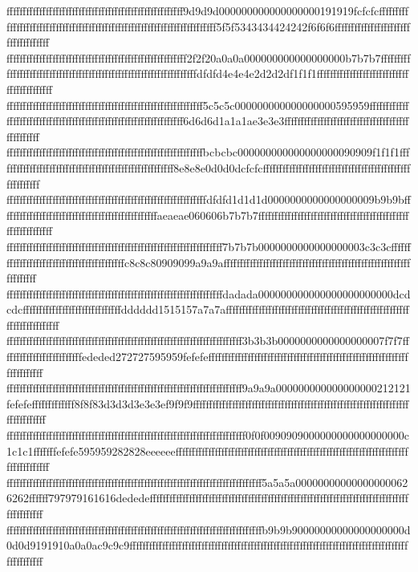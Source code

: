 {{{ffffffffffffffffffffffffffffffffffffffffffffffffffffff9d9d9d000000000000000000191919fcfcfcfffffffffffffffffffffffffffffffffffffffffffffffffffffffffffffffffffffffff5f5f5343434424242f6f6f6ffffffffffffffffffffffffffffffffffff
fffffffffffffffffffffffffffffffffffffffffffffffffffffff2f2f20a0a0a000000000000000000b7b7b7fffffffffffffffffffffffffffffffffffffffffffffffffffffffffffffffffffdfdfd4e4e4e2d2d2df1f1f1ffffffffffffffffffffffffffffffffffffffffff
ffffffffffffffffffffffffffffffffffffffffffffffffffffffffffff5c5c5c000000000000000000595959ffffffffffffffffffffffffffffffffffffffffffffffffffffffffffffffffff6d6d6d1a1a1ae3e3e3ffffffffffffffffffffffffffffffffffffffffffffffff
ffffffffffffffffffffffffffffffffffffffffffffffffffffffffffffbcbcbc000000000000000000090909f1f1f1ffffffffffffffffffffffffffffffffffffffffffffffffffffff8e8e8e0d0d0dcfcfcfffffffffffffffffffffffffffffffffffffffffffffffffffffff
fffffffffffffffffffffffffffffffffffffffffffffffffffffffffffffdfdfd1d1d1d0000000000000000009b9b9bffffffffffffffffffffffffffffffffffffffffffffffffaeaeae060606b7b7b7ffffffffffffffffffffffffffffffffffffffffffffffffffffffffffff
ffffffffffffffffffffffffffffffffffffffffffffffffffffffffffffffffff7b7b7b0000000000000000003c3c3cffffffffffffffffffffffffffffffffffffffffffc8c8c80909099a9a9affffffffffffffffffffffffffffffffffffffffffffffffffffffffffffffffff
ffffffffffffffffffffffffffffffffffffffffffffffffffffffffffffffffffdadada000000000000000000000000dcdcdcffffffffffffffffffffffffffffffdddddd1515157a7a7affffffffffffffffffffffffffffffffffffffffffffffffffffffffffffffffffffffff
ffffffffffffffffffffffffffffffffffffffffffffffffffffffffffffffffffffffff3b3b3b0000000000000000007f7f7fffffffffffffffffffffffffededed272727595959fefefeffffffffffffffffffffffffffffffffffffffffffffffffffffffffffffffffffffffff
ffffffffffffffffffffffffffffffffffffffffffffffffffffffffffffffffffffffff9a9a9a000000000000000000212121fefefefffffffffffff8f8f83d3d3d3e3e3ef9f9f9ffffffffffffffffffffffffffffffffffffffffffffffffffffffffffffffffffffffffffffff
fffffffffffffffffffffffffffffffffffffffffffffffffffffffffffffffffffffffff0f0f0090909000000000000000000c1c1c1fffffffefefe595959282828eeeeeeffffffffffffffffffffffffffffffffffffffffffffffffffffffffffffffffffffffffffffffffffff
ffffffffffffffffffffffffffffffffffffffffffffffffffffffffffffffffffffffffffffff5a5a5a000000000000000000626262ffffff797979161616dededeffffffffffffffffffffffffffffffffffffffffffffffffffffffffffffffffffffffffffffffffffffffffff
ffffffffffffffffffffffffffffffffffffffffffffffffffffffffffffffffffffffffffffffb9b9b90000000000000000000d0d0d9191910a0a0ac9c9c9ffffffffffffffffffffffffffffffffffffffffffffffffffffffffffffffffffffffffffffffffffffffffffffffff
}}}

